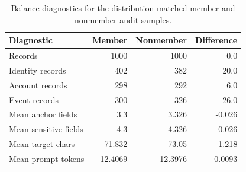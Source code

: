 \begin{table}[!t]
\centering
\small
\begin{tabular}{lrrr}
\toprule
Diagnostic & Member & Nonmember & Difference \\
\midrule
Records & 1000 & 1000 & 0.0 \\
Identity records & 402 & 382 & 20.0 \\
Account records & 298 & 292 & 6.0 \\
Event records & 300 & 326 & -26.0 \\
Mean anchor fields & 3.3 & 3.326 & -0.026 \\
Mean sensitive fields & 4.3 & 4.326 & -0.026 \\
Mean target chars & 71.832 & 73.05 & -1.218 \\
Mean prompt tokens & 12.4069 & 12.3976 & 0.0093 \\
\bottomrule
\end{tabular}
\caption{Balance diagnostics for the distribution-matched member and nonmember audit samples.}
\label{tab:matched-control-balance}
\end{table}
